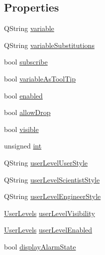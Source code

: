 \subsection*{Properties}
\begin{DoxyCompactItemize}
\item 
QString \hyperlink{classQESlider_a05487f9ab40b5e702c667d9f5f85ed11}{variable}
\item 
QString \hyperlink{classQESlider_a5fceb1ae46d97fff9a7126d37187e4d3}{variableSubstitutions}
\item 
bool \hyperlink{classQESlider_a461c0ea162ed9dbaa19b351b78e816e5}{subscribe}
\item 
bool \hyperlink{classQESlider_a83070f4d66da78e7724f99ad0307edd8}{variableAsToolTip}
\item 
bool \hyperlink{classQESlider_a7443c8c101d387a8d70a66e0e30b96ac}{enabled}
\item 
bool \hyperlink{classQESlider_a73f36512a78d3dac3d3087c4c8d2f701}{allowDrop}
\item 
bool \hyperlink{classQESlider_aa9b8d77780b3bf701cf7cfa3f3834f19}{visible}
\item 
unsigned \hyperlink{classQESlider_af63af49eb378a42d4fd143ab539b5514}{int}
\item 
QString \hyperlink{classQESlider_a6bceb6caaac935a3c91363e0ae2e0d4a}{userLevelUserStyle}
\item 
QString \hyperlink{classQESlider_a352f3029807d1a093bb471c8db7aaf41}{userLevelScientistStyle}
\item 
QString \hyperlink{classQESlider_a29aad01614cf12b140123348a37bdfd0}{userLevelEngineerStyle}
\item 
\hyperlink{classQESlider_ad8ddcac593e2ec7441ae04ec7c8a7b26}{UserLevels} \hyperlink{classQESlider_a6aea2f373a3b07597dd8db1dcb2803cc}{userLevelVisibility}
\item 
\hyperlink{classQESlider_ad8ddcac593e2ec7441ae04ec7c8a7b26}{UserLevels} \hyperlink{classQESlider_a1cd3bdc1252e8df1fe4769ec93748d8a}{userLevelEnabled}
\item 
bool \hyperlink{classQESlider_a7b8aa02993b037b8b8dd94b811091178}{displayAlarmState}
\end{DoxyCompactItemize}


